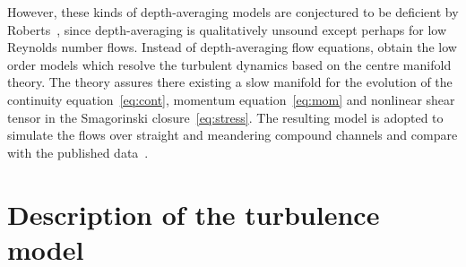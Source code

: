 \documentclass[a5paper,12pt]{article}
\begin{document}
However, these kinds of depth-averaging models are conjectured to be deficient by Roberts~\cite{Roberts1996}, since depth-averaging is qualitatively unsound except perhaps for low Reynolds number flows.
Instead of depth-averaging flow equations, obtain the low order models which resolve the turbulent dynamics based on the centre manifold theory. 
The theory assures there existing a slow manifold for the evolution of the continuity equation~\eqref{eq:cont}, momentum equation~\eqref{eq:mom} and nonlinear shear tensor in the Smagorinski closure~\eqref{eq:stress}.
The resulting model is adopted to simulate the flows over straight and meandering compound channels and compare with the published data~\cite[e.g.]{Bousmar2002,Liu2009}.


\section{Description of the turbulence model}
\end{document}
